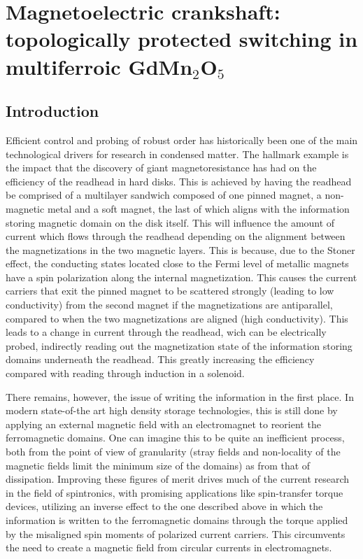 \newcommand{\Jpar}{J_{||}}
\newcommand{\Jperp}{J_{\perp}}
\chapter{Magnetoelectric crankshaft: topologically protected switching in multiferroic GdMn$_2$O$_5$}
\section{Introduction}
Efficient control and probing of robust order has historically been one of the main technological drivers for research in condensed matter.
The hallmark example is the impact that the discovery of giant magnetoresistance has had on the efficiency of the readhead in hard disks.
This is achieved by having the readhead be comprised of a multilayer sandwich composed of one pinned magnet, a non-magnetic metal and a soft magnet, the last of which aligns with the information storing magnetic domain on the disk itself.
This will influence the amount of current which flows through the readhead depending on the alignment between the magnetizations in the two magnetic layers. This is because, due to the Stoner effect, the conducting states located close to the Fermi level of metallic magnets have a spin polarization along the internal magnetization. This causes the current carriers that exit the pinned magnet to be scattered strongly (leading to low conductivity) from the second magnet if the magnetizations are antiparallel, compared to when the two magnetizations are aligned (high conductivity).
This leads to a change in current through the readhead, wich can be electrically probed, indirectly reading out the magnetization state of the information storing domains underneath the readhead.
This greatly increasing the efficiency compared with reading through induction in a solenoid.

There remains, however, the issue of writing the information in the first place.
In modern state-of-the art high density storage technologies, this is still done by applying an external magnetic field with an electromagnet to reorient the ferromagnetic domains. One can imagine this to be quite an inefficient process, both from the point of view of granularity (stray fields and non-locality of the magnetic fields limit the minimum size of the domains) as from that of dissipation.
Improving these figures of merit drives much of the current research in the field of spintronics, with promising applications like spin-transfer torque devices, utilizing an inverse effect to the one described above in which the information is written to the ferromagnetic domains through the torque applied by the misaligned spin moments of polarized current carriers. This circumvents the need to create a magnetic field from circular currents in electromagnets.

